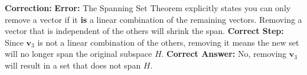 \documentclass[12pt]{article}
\begin{document}
\textbf{Correction:}
\textbf{Error:} The Spanning Set Theorem explicitly states you can only remove a vector if it \textbf{is} a linear combination of the remaining vectors. Removing a vector that is independent of the others will shrink the span.
\textbf{Correct Step:} Since $\mathbf{v}_3$ is not a linear combination of the others, removing it means the new set will no longer span the original subspace $H$.
\textbf{Correct Answer:} No, removing $\mathbf{v}_3$ will result in a set that does not span $H$.
\end{document}
